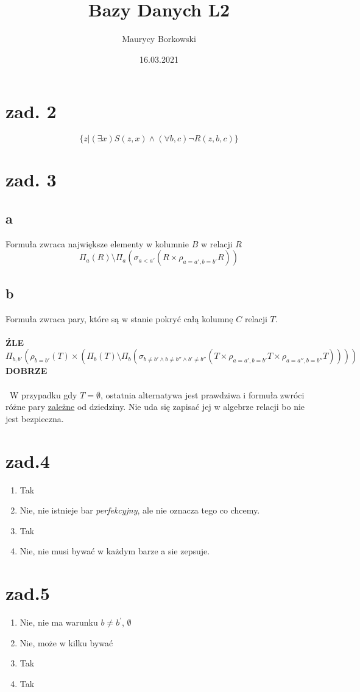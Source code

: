\documentclass{article}
\title{Bazy Danych L2}
\date{16.03.2021}
\author{Maurycy Borkowski}
\begin{document}
\maketitle

\section{zad. 2}
$$
\{z | (\exists x) S(z,x) \land (\forall b,c) \neg R(z,b,c)\}
$$

\section{zad. 3}
\subsection*{a}
Formuła zwraca największe elementy w kolumnie $B$ w relacji $R$
$$\Pi_{a}(R) \setminus \Pi_{a}(\sigma_{a < a'}(R \times \rho_{a = a', b = b'}R))$$

\subsection*{b}
Formuła zwraca pary, które są w stanie pokryć całą kolumnę $C$ relacji $T$.\\\\
\textbf{ŹLE}
$$\Pi_{b,b'} (\rho_{b=b'} (T) \times (\Pi_{b}(T) \setminus \Pi_{b}(\sigma_{b \neq b' \land b \neq b'' \land b' \neq b''}(T \times \rho_{a = a', b = b'}T \times \rho_{a = a'', b = b''}T))))$$
\textbf{DOBRZE}\\\\\
W przypadku gdy $T = \emptyset$, ostatnia alternatywa jest prawdziwa i formuła zwróci różne pary \underline{zależne} od dziedziny. Nie uda się zapisać jej w algebrze relacji bo nie jest bezpieczna.

\section{zad.4}
\begin{enumerate}
  \item Tak
  \item Nie, nie istnieje bar \textit{perfekcyjny}, ale nie oznacza tego co chcemy.
  \item Tak
  \item Nie, nie musi bywać w każdym barze a sie zepsuje.
\end{enumerate}
\section{zad.5}
\begin{enumerate}
  \item Nie, nie ma warunku $b \neq b^\prime$, $\emptyset$
  \item Nie, może w kilku bywać
  \item Tak
  \item Tak
\end{enumerate}
\end{document}
